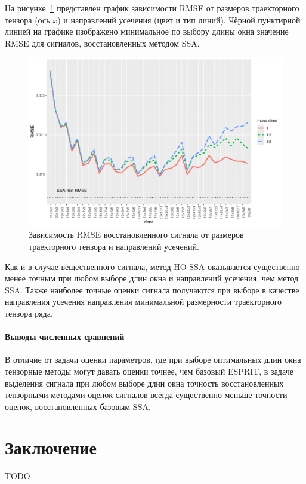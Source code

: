 \documentclass[specialist,
  substylefile=spbu_report.rtx,
subf,href,colorlinks=true, 12pt]{disser}
\theoremstyle{plain}
\theoremstyle{definition}
\theoremstyle{remark}
\begin{document}
На рисунке~\ref{fig:rec-dims} представлен график зависимости RMSE от размеров
траекторного тензора (ось $x$) и направлений усечения (цвет и тип линий).
Чёрной пунктирной линией на графике изображено минимальное по выбору длины окна
значение RMSE для сигналов, восстановленных методом SSA.
\begin{figure}[!ht]
  \centering
  \includegraphics[width=\textwidth, height=0.4\textheight]{rec_dim_rmse}
  \caption{Зависимость RMSE восстановленного сигнала от размеров траекторного тензора
  и направлений усечений.}\label{fig:rec-dims}
\end{figure}
Как и в случае вещественного сигнала, метод HO-SSA оказывается существенно менее точным при
любом выборе длин окна и направлений усечения, чем метод SSA.
Также наиболее точные оценки сигнала получаются при выборе в качестве
направления усечения направления минимальной размерности траекторного тензора ряда.

\paragraph{Выводы численных сравнений}
В отличие от задачи оценки параметров, где при выборе оптимальных длин окна
тензорные методы могут давать оценки точнее, чем базовый ESPRIT, в задаче выделения
сигнала при любом выборе длин окна точность восстановленных тензорными
методами оценок сигналов всегда существенно меньше точности оценок, восстановленных
базовым SSA.
\newpage

\section{Заключение}\label{sec:conclusion}
TODO
\end{document}
